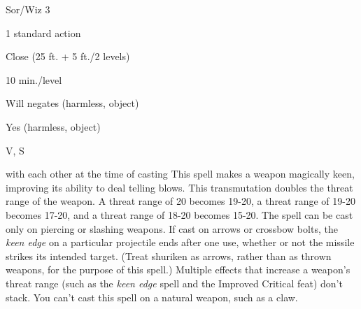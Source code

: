 
\begin{description*}
\item[Level:] Sor/Wiz 3
\item[Casting Time:] 1 standard action
\item[Range:] Close (25 ft. + 5 ft./2 levels)
\item[Duration:] 10 min./level
\item[Saving Throw:] Will negates (harmless, object)
\item[Spell Resistance:] Yes (harmless, object)
\item[Components:] V, S
\end{description*}

with each other at the time of casting
This spell makes a weapon magically keen, improving its ability to deal telling
blows. This transmutation doubles the threat range of the weapon. A threat range
of 20 becomes 19-20, a threat range of 19-20 becomes 17-20, and a threat range
of 18-20 becomes 15-20. The spell can be cast only on piercing or slashing weapons.
If cast on arrows or crossbow bolts, the \textit{keen edge} on a particular projectile
ends after one use, whether or not the missile strikes its intended target. (Treat
shuriken as arrows, rather than as thrown weapons, for the purpose of this spell.)
Multiple effects that increase a weapon's threat range (such as the \textit{keen
edge} spell and the Improved Critical feat) don't stack. You can't cast this spell
on a natural weapon, such as a claw.